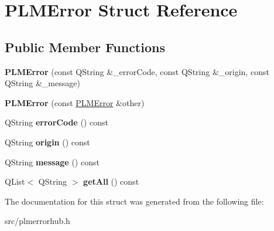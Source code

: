 \hypertarget{struct_p_l_m_error}{}\section{P\+L\+M\+Error Struct Reference}
\label{struct_p_l_m_error}
\subsection*{Public Member Functions}
\begin{DoxyCompactItemize}
\item 
{\bfseries P\+L\+M\+Error} (const Q\+String \&\+\_\+error\+Code, const Q\+String \&\+\_\+origin, const Q\+String \&\+\_\+message)\hypertarget{struct_p_l_m_error_a1c7506dd5f92e0fc5623e69913d1e1dc}{}\label{struct_p_l_m_error_a1c7506dd5f92e0fc5623e69913d1e1dc}

\item 
{\bfseries P\+L\+M\+Error} (const \hyperlink{struct_p_l_m_error}{P\+L\+M\+Error} \&other)\hypertarget{struct_p_l_m_error_ab3452bc2a78eb5703c6275f75ac58f08}{}\label{struct_p_l_m_error_ab3452bc2a78eb5703c6275f75ac58f08}

\item 
Q\+String {\bfseries error\+Code} () const \hypertarget{struct_p_l_m_error_a92c888b245c56159ed52a7b62499e05a}{}\label{struct_p_l_m_error_a92c888b245c56159ed52a7b62499e05a}

\item 
Q\+String {\bfseries origin} () const \hypertarget{struct_p_l_m_error_a2d83f9bd2c2f4ae3e50ab69385f7b943}{}\label{struct_p_l_m_error_a2d83f9bd2c2f4ae3e50ab69385f7b943}

\item 
Q\+String {\bfseries message} () const \hypertarget{struct_p_l_m_error_a070e473664207f3b31eaf52f2a419aa5}{}\label{struct_p_l_m_error_a070e473664207f3b31eaf52f2a419aa5}

\item 
Q\+List$<$ Q\+String $>$ {\bfseries get\+All} () const \hypertarget{struct_p_l_m_error_a3be7c3f7778f48f785c2607c6b13174a}{}\label{struct_p_l_m_error_a3be7c3f7778f48f785c2607c6b13174a}

\end{DoxyCompactItemize}


The documentation for this struct was generated from the following file\+:\begin{DoxyCompactItemize}
\item 
src/plmerrorhub.\+h\end{DoxyCompactItemize}
